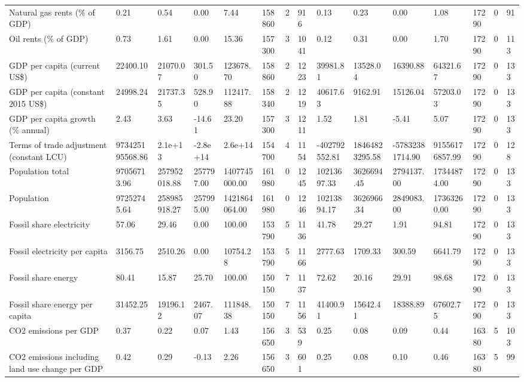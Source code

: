 \begin{longtable}{lllllllllllllll}
\addlinespace
Natural gas rents (\% of GDP) & 0.21 & 0.54 & 0.00 & 7.44 & 158860 & 2 & 916 & 0.13 & 0.23 & 0.00 & 1.08 & 17290 & 0 & 91\\
Oil rents (\% of GDP) & 0.73 & 1.61 & 0.00 & 15.36 & 157300 & 3 & 1041 & 0.12 & 0.31 & 0.00 & 1.70 & 17290 & 0 & 113\\
GDP per capita (current US\$) & 22400.10 & 21070.07 & 301.50 & 123678.70 & 158860 & 2 & 1223 & 39981.81 & 13528.04 & 16390.88 & 64321.67 & 17290 & 0 & 133\\
GDP per capita (constant 2015 US\$) & 24998.24 & 21737.35 & 528.90 & 112417.88 & 158340 & 2 & 1219 & 40617.63 & 9162.91 & 15126.04 & 57203.03 & 17290 & 0 & 133\\
GDP per capita growth (\% annual) & 2.43 & 3.63 & -14.61 & 23.20 & 157300 & 3 & 1211 & 1.52 & 1.81 & -5.41 & 5.07 & 17290 & 0 & 133\\
\addlinespace
Terms of trade adjustment (constant LCU) & 973425195568.86 & 2.1e+13 & -2.8e+14 & 2.6e+14 & 154700 & 4 & 1154 & -402792552.81 & 18464823295.58 & -57832381714.90 & 91556176857.99 & 17290 & 0 & 128\\
Population total & 97056713.96 & 257952018.88 & 257797.00 & 1407745000.00 & 161980 & 0 & 1245 & 10213697.33 & 3626694.45 & 2794137.00 & 17344874.00 & 17290 & 0 & 133\\
Population & 97252745.64 & 258985918.27 & 257995.00 & 1421864064.00 & 161980 & 0 & 1246 & 10213894.17 & 3626966.34 & 2849083.00 & 17363260.00 & 17290 & 0 & 133\\
Fossil share electricity & 57.06 & 29.46 & 0.00 & 100.00 & 153790 & 5 & 1136 & 41.78 & 29.27 & 1.91 & 94.81 & 17290 & 0 & 133\\
Fossil electricity per capita & 3156.75 & 2510.26 & 0.00 & 10754.28 & 153790 & 5 & 1166 & 2777.63 & 1709.33 & 300.59 & 6641.79 & 17290 & 0 & 133\\
\addlinespace
Fossil share energy & 80.41 & 15.87 & 25.70 & 100.00 & 150150 & 7 & 1137 & 72.62 & 20.16 & 29.91 & 98.68 & 17290 & 0 & 133\\
Fossil share energy per capita & 31452.25 & 19196.12 & 2467.07 & 111848.38 & 150150 & 7 & 1156 & 41400.91 & 15642.41 & 18388.89 & 67602.75 & 17290 & 0 & 133\\
CO2 emissions per GDP & 0.37 & 0.22 & 0.07 & 1.43 & 156650 & 3 & 539 & 0.25 & 0.08 & 0.09 & 0.44 & 16380 & 5 & 103\\
CO2 emissions including land use change per GDP & 0.42 & 0.29 & -0.13 & 2.26 & 156650 & 3 & 601 & 0.25 & 0.08 & 0.10 & 0.46 & 16380 & 5 & 99\\

\end{longtable}
